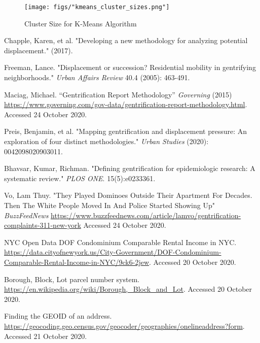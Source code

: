 \documentclass[a4paper, 12pt]{article}
\numberwithin{equation}{section}
\begin{document}
	           \begin{figure}[H]
				    \centering
				    \texttt{[image: figs/"kmeans\_cluster\_sizes.png"]}
				    \caption{Cluster Size for K-Means Algorithm}
				    \label{fig:kmeans-clusters}
			    \end{figure}
	\newpage
	
			
	\newpage
	
	\begin{thebibliography}{20} 
		
		
		 Chapple, Karen, et al. "Developing a new methodology for analyzing potential displacement." (2017).
		
		 Freeman, Lance. "Displacement or succession? Residential mobility in gentrifying neighborhoods." \emph{Urban Affairs Review} 40.4 (2005): 463-491.
		
		 Maciag, Michael. “Gentrification Report Methodology” \emph{Governing} (2015) \url{https://www.governing.com/gov-data/gentrification-report-methodology.html}. Accessed 24 October 2020.
		
		 Preis, Benjamin, et al. "Mapping gentrification and displacement pressure: An exploration of four distinct methodologies." \emph{Urban Studies} (2020): 0042098020903011.
		
		 Bhavsar, Kumar, Richman. "Defining gentrification for epidemiologic research: A systematic review." \emph{PLOS ONE}. 15(5):e0233361.
		
		 Vo, Lam Thuy. "They Played Dominoes Outside Their Apartment For Decades. Then The White People Moved In And Police Started Showing Up" \emph{BuzzFeedNews} \url{https://www.buzzfeednews.com/article/lamvo/gentrification-complaints-311-new-york} Accessed 24 October 2020.
		
        NYC Open Data DOF Condominium Comparable Rental Income in NYC.
        \url{https://data.cityofnewyork.us/City-Government/DOF-Condominium-Comparable-Rental-Income-in-NYC/9ck6-2jew}. Accessed 20 October 2020.
        
        Borough, Block, Lot parcel number system. \url{https://en.wikipedia.org/wiki/Borough,_Block_and_Lot}. Accessed 20 October 2020.
        
         Finding the GEOID of an address. \url{https://geocoding.geo.census.gov/geocoder/geographies/onelineaddress?form}. Accessed 21 October 2020.
        

\end{thebibliography}
\end{document}
